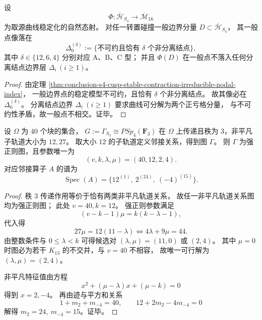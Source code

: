 \begin{proposition}\label{prop:conclusion-s4-hurwitz-to-m16-boundary-image-delta0}
设
\[
\Phi:\overline{\mathcal H}_{S_4}\longrightarrow \overline{\mathcal M}_{16}
\]
为取源曲线稳定化的自然态射。
对任一转置碰撞一般边界分量 \(D\subset \overline{\mathcal H}_{S_4}\)，
其一般点像落在
\[
\Delta_0^{(\delta)}
:=\{\text{不可约且恰有 \(\delta\) 个非分离结点}\},
\]
其中 \(\delta\in\{12,6,4\}\) 分别对应 A、B、C 型；
并且 \(\Phi(D)\) 在一般点不落入任何分离结点边界层 \(\Delta_i\,(i\ge 1)\)。
\end{proposition}
\begin{proof}
由定理 \ref{thm:conclusion-s4-cusp-stable-contraction-irreducible-nodal-index}，
一般边界点的稳定模型不可约，且恰有 \(\delta\) 个非分离结点。
故其像必在 \(\Delta_0^{(\delta)}\)。
分离结点边界 \(\Delta_i\ (i\ge 1)\) 要求曲线可分解为两个正亏格分量，
与不可约性矛盾，故一般点不相交。证毕。
\end{proof}

\begin{theorem}[40 块秩 \(3\) 作用诱导的强正则图参数与谱唯一性]\label{thm:conclusion-s4-40blocks-rank3-strongly-regular-parameters}
设 \(\Omega\) 为 \(40\) 个块的集合，
\(
G:=\Gamma_{S_3}\cong PSp_4(\mathbf F_3)
\)
在 \(\Omega\) 上传递且秩为 \(3\)，非平凡子轨道大小为 \(12,27\)。
取大小 \(12\) 的子轨道定义邻接关系，得到图 \(\Gamma\)。
则 \(\Gamma\) 为强正则图，且参数唯一为
\[
(v,k,\lambda,\mu)=(40,12,2,4).
\]
对应邻接算子 \(A\) 的谱为
\[
\operatorname{Spec}(A)=\{12^{(1)},\ 2^{(24)},\ (-4)^{(15)}\}.
\]
\end{theorem}
\begin{proof}
秩 \(3\) 传递作用等价于恰有两类非平凡轨道关系，
故任一非平凡轨道关系图均为强正则图；
此处 \(v=40,k=12\)。
强正则参数满足
\[
(v-k-1)\mu=k(k-\lambda-1),
\]
代入得
\[
27\mu=12(11-\lambda)\iff 4\lambda+9\mu=44.
\]
由整数条件与 \(0\le \lambda<k\) 可得候选对
\((\lambda,\mu)=(11,0)\) 或 \((2,4)\)。
其中 \(\mu=0\) 时图必为若干 \(K_{13}\) 的不交并，与 \(v=40\) 不相容，
故唯一可行解为 \((\lambda,\mu)=(2,4)\)。

非平凡特征值由方程
\[
x^2+(\mu-\lambda)x+(\mu-k)=0
\]
得到 \(x=2,-4\)。
再由迹与平方和关系
\[
1+m_2+m_{-4}=40,\qquad
12+2m_2-4m_{-4}=0
\]
解得 \(m_2=24,\ m_{-4}=15\)。证毕。
\end{proof}

